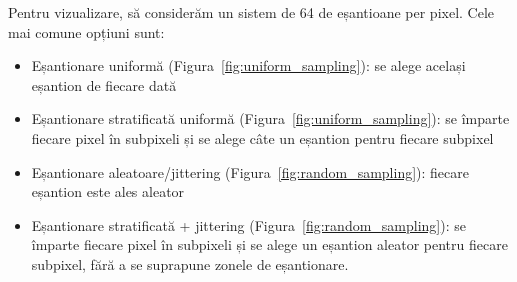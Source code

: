 \documentclass[12pt,a4paper]{report}
\numberwithin{equation}{section} %
\begin{document}
Pentru vizualizare, să considerăm un sistem de 64 de eșantioane per pixel.
Cele mai comune opțiuni sunt:
\begin{itemize}
	\item Eșantionare uniformă (Figura~\ref{fig:uniform_sampling}): se alege același eșantion de fiecare dată
	\item Eșantionare stratificată uniformă (Figura~\ref{fig:uniform_sampling}): se împarte fiecare pixel în subpixeli și se alege câte un eșantion pentru fiecare subpixel
	\item Eșantionare aleatoare/jittering (Figura~\ref{fig:random_sampling}): fiecare eșantion este ales aleator
	\item Eșantionare stratificată + jittering (Figura~\ref{fig:random_sampling}): se împarte fiecare pixel în subpixeli și se alege un eșantion aleator pentru fiecare subpixel,
	      fără a se suprapune zonele de eșantionare.
\end{itemize}
\end{document}

